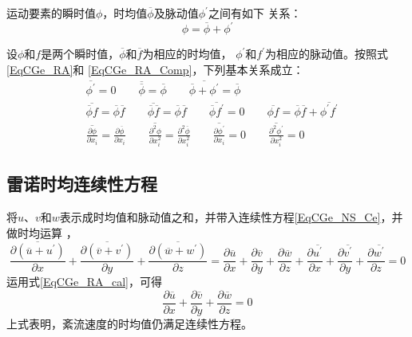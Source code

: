 运动要素的瞬时值$\phi$，时均值$\overline{\phi}$及脉动值$\phi^{\prime}$之间有如下
关系：
\begin{equation}
  \phi = \overline{\phi} + \phi^{\prime}
  \label{EqCGe_RA_Comp}
\end{equation}

设$\phi$和$f$是两个瞬时值，$\overline{\phi}$和$\overline{f}$为相应的时均值，
$\phi^{\prime}$和$f^{\prime}$为相应的脉动值。按照式\eqref{EqCGe_RA}和
\eqref{EqCGe_RA_Comp}，下列基本关系成立：
\begin{equation}
  \begin{aligned}
    &\overline{\phi^{\prime}} = 0
    \quad\quad
    \overline{\overline{\phi}} = \overline{\phi}
    \quad\quad
    \overline{\overline{\phi}+\phi^{\prime}} = \overline{\phi}
    \\
    & \overline{\overline{\phi}f} = \overline{\phi}\overline{f}
    \quad\quad
    \overline{\overline{\phi}\overline{f}} = \overline{\phi}\overline{f}
    \quad\quad
    \overline{\overline{\phi}f^{\prime}} = 0
    \quad\quad
    \overline{\phi f} = \overline{\phi}\overline{f} +
    \overline{\phi^{\prime}f^{\prime}}
    \\
    & \overline{\frac{\partial\phi}{\partial x_{i}}} = \frac{\partial \overline{\phi}}{\partial x_{i}}
    \quad\quad
    \overline{\frac{\partial^{2}\phi}{\partial x_{i}^{2}}} = \frac{\partial^{2}
    \overline{\phi}}{\partial x_{i}^{2}}
    \quad\quad
    \overline{\frac{\partial\phi^{\prime}}{\partial x_{i}}} = 0
    \quad\quad
    \overline{\frac{\partial^{2}\phi^{\prime}}{\partial x_{i}^{2}}} = 0
  \end{aligned}
  \label{EqCGe_RA_cal}
\end{equation}

\subsection{雷诺时均连续性方程}
将$u$、$v$和$w$表示成时均值和脉动值之和，并带入连续性方程\eqref{EqCGe_NS_Ce}，并做时均运算
，
\begin{equation*}
  \overline{
    \frac{\partial(\overline{u}+u^{\prime})}{\partial x}
  }
  +
  \overline{
    \frac{\partial(\overline{v}+v^{\prime})}{\partial y}
  }
  +
  \overline{
    \frac{\partial(\overline{w}+w^{\prime})}{\partial z}
  }
  =
  \frac{\partial \overline{u}}{\partial x} +
  \frac{\partial \overline{v}}{\partial y} +
  \frac{\partial \overline{w}}{\partial z} +
  \frac{\partial \overline{u^{\prime}}}{\partial x} +
  \frac{\partial \overline{v^{\prime}}}{\partial y} +
  \frac{\partial \overline{w^{\prime}}}{\partial z}
  =0
\end{equation*}
运用式\eqref{EqCGe_RA_cal}，可得
\begin{equation}
  \frac{\partial \overline{u}}{\partial x} +
  \frac{\partial \overline{v}}{\partial y} +
  \frac{\partial \overline{w}}{\partial z}
  =
  0
\end{equation}
上式表明，紊流速度的时均值仍满足连续性方程。

